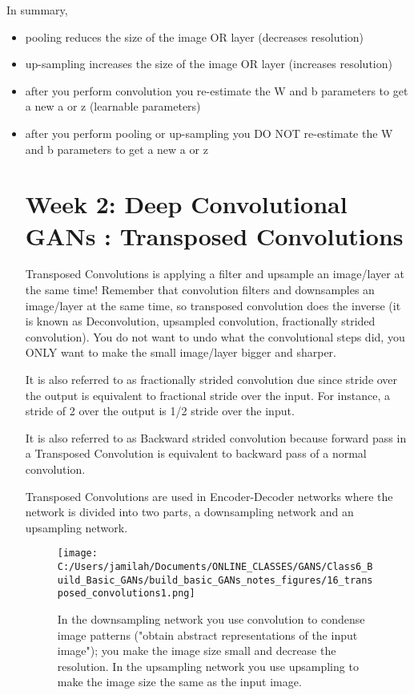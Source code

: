 \documentclass[11pt, onecolumn]{article}
\begin{document}
In summary, 
\begin{itemize}
\item pooling reduces the size of the image OR layer (decreases resolution)
\item up-sampling increases the size of the image OR layer (increases resolution)
\item after you perform convolution you re-estimate the W and b parameters to get a new a or z (learnable parameters)
\item after you perform pooling or up-sampling you DO NOT re-estimate the W and b parameters to get a new a or z

\section{Week 2: Deep Convolutional GANs : Transposed Convolutions}


Transposed Convolutions is applying a filter and upsample an image/layer at the same time!  Remember that convolution filters and downsamples an image/layer at the same time, so transposed convolution does the inverse (it is known as Deconvolution, upsampled convolution, fractionally strided convolution).  You do not want to undo what the convolutional steps did, you ONLY want to make the small image/layer bigger and sharper.

It is also referred to as fractionally strided convolution due since stride over the output is equivalent to fractional stride over the input. For instance, a stride of 2 over the output is 1/2 stride over the input.

It is also referred to as Backward strided convolution because forward pass in a Transposed Convolution is equivalent to backward pass of a normal convolution.

Transposed Convolutions are used in Encoder-Decoder networks where the network is divided into two parts, a downsampling network and an upsampling network. 

\begin{figure}[htp]
\begin{center}
\texttt{[image: C:/Users/jamilah/Documents/ONLINE\_CLASSES/GANS/Class6\_Build\_Basic\_GANs/build\_basic\_GANs\_notes\_figures/16\_transposed\_convolutions1.png]}
\end{center}
\caption{In the downsampling network you use convolution to condense image patterns ("obtain abstract representations of the input image"); you make the image size small and decrease the resolution.  In the upsampling network you use upsampling to make the image size the same as the input image.}
\label{16_transposed_convolutions1}
\end{figure}


\end{itemize}
\end{document}
